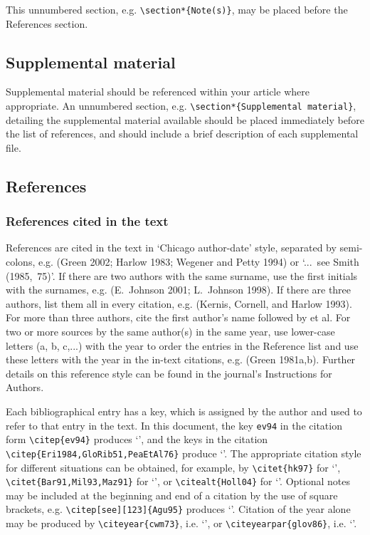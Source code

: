 \documentclass[]{tEIS2e}
\theoremstyle{plain}
\theoremstyle{remark}
\begin{document}
This unnumbered section, e.g. \verb"\section*{Note(s)}", may be placed before the References section.


\subsection{Supplemental material}

Supplemental material should be referenced within your article where appropriate. An unnumbered section, e.g. \verb"\section*{Supplemental material}", detailing the supplemental material available should be placed immediately before the list of references, and should include a brief description of each supplemental file.


\subsection{References}\label{refs}

\subsubsection{References cited in the text}

References are cited in the text in `Chicago author-date' style, separated by semi-colons, e.g. (Green 2002; Harlow 1983; Wegener and Petty 1994) or `...~see Smith (1985,~75)'. If there are two authors with the same surname, use the first initials with the surnames, e.g. (E.~Johnson 2001; L.~Johnson 1998). If there are three authors, list them all in every citation, e.g. (Kernis, Cornell, and Harlow 1993). For more than three authors, cite the first author's name followed by et al. For two or more sources by the same author(s) in the same year, use lower-case letters (a, b, c,...) with the year to order the entries in the Reference list and use these letters with the year in the in-text citations, e.g. (Green 1981a,b). Further details on this reference style can be found in the journal's Instructions for Authors.

Each bibliographical entry has a key, which is assigned by the author and used to refer to that entry in the text. In this document, the key \verb"ev94" in the citation form \verb"\citep{ev94}" produces `\citep{ev94}', and the keys in the citation \verb"\citep{Eri1984,GloRib51,PeaEtAl76}" produce `\citep{Eri1984,GloRib51,PeaEtAl76}'. The appropriate citation style for different situations can be obtained, for example, by \verb"\citet{hk97}" for `\citet{hk97}', \verb"\citet{Bar91,Mil93,Maz91}" for `\citet{Bar91,Mil93,Maz91}', or \verb"\citealt{Holl04}" for `\citealt{Holl04}'. Optional notes may be included at the beginning and end of a citation by the use of square brackets, e.g. \verb"\citep[see][123]{Agu95}" produces `\citep[see][123]{Agu95}'. Citation of the year alone may be produced by \verb"\citeyear{cwm73}", i.e. `\citeyear{cwm73}', or \verb"\citeyearpar{glov86}", i.e. `\citeyearpar{glov86}'.
\end{document}
